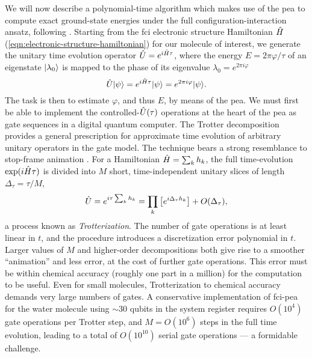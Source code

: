 We will now describe a polynomial-time algorithm which makes use of the \gls{pea} to compute exact ground-state energies under the full configuration-interaction ansatz, following \cite{Whitfield2011, Wecker2013}.
Starting from the \gls{fci} electronic structure Hamiltonian $\hat{H}$ (\ref{eqn:electronic-structure-hamiltonian}) for our molecule of interest, we generate the unitary time evolution operator $\hat{U} = e^{i \hat{H} \tau}$, where the energy $E=2\pi \varphi / \tau$ of an eigenstate $\mbox{$ | \lambda_0 \rangle $}$ is mapped to the phase of its eigenvalue $\lambda_0 = e^{2\pi i \varphi}$ 
\begin{equation}
    \hat{U} \mbox{$ | \psi \rangle $} = e^{i \hat{H} \tau} \mbox{$ | \psi \rangle $} = e^{2\pi i \varphi} \mbox{$ | \psi \rangle $}.
\end{equation}
The task is then to estimate $\varphi$, and thus $E$, by means of the \gls{pea}. We must first be able to implement the controlled-$\hat{U}(\tau)$ operations at the heart of the \gls{pea} as gate sequences in a digital quantum computer. The Trotter decomposition provides a general prescription for approximate time evolution of arbitrary unitary operators in the gate model. The technique bears a strong resemblance to stop-frame animation \cite{Johnston1981}. For a Hamiltonian $\hat{H} = \sum_k h_k$, the full time-evolution $\exp(i\hat{H} \tau)$ is divided into $M$ short, time-independent unitary slices of length $\Delta_\tau = \tau/M$,
\begin{equation}
    \hat{U}=e^{i \tau \sum_k h_k } = \prod_k \left[ e^{i\Delta_\tau h_k}   \right] + O(\Delta_\tau),
\end{equation}
a process known as \emph{Trotterization}.
The number of gate operations is at least linear in $t$, and the procedure introduces a discretization error polynomial in $t$. Larger values of $M$ and higher-order decompositions both give rise to a smoother ``animation'' and less error, at the cost of further gate operations. This error must be within chemical accuracy (roughly one part in a million) for the computation to be useful. Even for small molecules, Trotterization to chemical accuracy demands very large numbers of gates. A conservative implementation of \gls{fci}-\gls{pea} for the water molecule using $\sim 30$ qubits in the system register requires $O(10^4)$ gate operations per Trotter step, and $M = O(10^6)$ steps in the full time evolution, leading to a total of $O(10^{10})$ serial gate operations \cite{Wecker2013} --- a formidable challenge.

